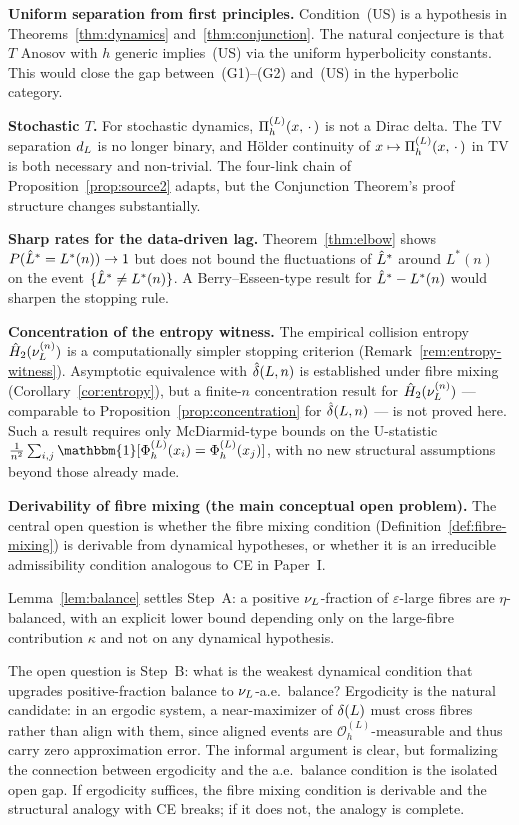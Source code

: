 \textbf{Uniform separation from first principles.}
Condition~(US) is a hypothesis in Theorems~\ref{thm:dynamics}
and~\ref{thm:conjunction}.
The natural conjecture is that $T$ Anosov with $h$ generic implies~(US) via
the uniform hyperbolicity constants.
This would close the gap between~(G1)--(G2) and~(US) in the hyperbolic category.

\textbf{Stochastic $T$.}
For stochastic dynamics, $\Pi_h^{(L)}(x,\,\cdot\,)$ is not a Dirac delta.
The TV separation $d_{L}$ is no longer binary, and Hölder continuity
of $x \mapsto \Pi_h^{(L)}(x,\,\cdot\,)$ in TV is both necessary and non-trivial.
The four-link chain of Proposition~\ref{prop:source2} adapts, but the
Conjunction Theorem's proof structure changes substantially.

\textbf{Sharp rates for the data-driven lag.}
Theorem~\ref{thm:elbow} shows $P(\hat{L}^* = L^*(n)) \to 1$ but does not bound
the fluctuations of $\hat{L}^*$ around $L^*(n)$ on the event $\{\hat{L}^* \neq L^*(n)\}$.
A Berry--Esseen-type result for $\hat{L}^* - L^*(n)$ would sharpen the stopping rule.

\textbf{Concentration of the entropy witness.}
The empirical collision entropy $\hat{H}_2(\nu_L^{(n)})$ is a computationally
simpler stopping criterion (Remark~\ref{rem:entropy-witness}).
Asymptotic equivalence with $\hat{\delta}(L,n)$ is established under fibre mixing
(Corollary~\ref{cor:entropy}), but a finite-$n$ concentration result for
$\hat{H}_2(\nu_L^{(n)})$ --- comparable to Proposition~\ref{prop:concentration}
for $\hat{\delta}(L,n)$ --- is not proved here.
Such a result requires only McDiarmid-type bounds on the U-statistic
$\frac{1}{n^2}\sum_{i,j} \mathbbm{1}[\PhiL(x_i) = \PhiL(x_j)]$, with no
new structural assumptions beyond those already made.

\textbf{Derivability of fibre mixing (the main conceptual open problem).}
The central open question is whether the fibre mixing condition
(Definition~\ref{def:fibre-mixing}) is derivable from dynamical hypotheses, or
whether it is an irreducible admissibility condition analogous to CE in Paper~I.

Lemma~\ref{lem:balance} settles Step~A: a positive $\nu_L$-fraction of
$\varepsilon$-large fibres are $\eta$-balanced, with an explicit lower bound
depending only on the large-fibre contribution $\kappa$ and not on any dynamical
hypothesis.

The open question is Step~B: what is the weakest dynamical condition that
upgrades positive-fraction balance to $\nu_L$-a.e.\ balance?  Ergodicity is the
natural candidate: in an ergodic system, a near-maximizer of $\delta(L)$ must
cross fibres rather than align with them, since aligned events are
$\mathcal{O}_h^{(L)}$-measurable and thus carry zero approximation error.  The
informal argument is clear, but formalizing the connection between ergodicity
and the a.e.\ balance condition is the isolated open gap.  If ergodicity
suffices, the fibre mixing condition is derivable and the structural analogy
with CE breaks; if it does not, the analogy is complete.



